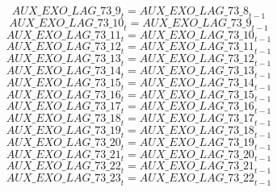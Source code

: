 \begin{dmath}
{AUX\_EXO\_LAG\_73\_9}_{t}={AUX\_EXO\_LAG\_73\_8}_{t-1}
\end{dmath}
\begin{dmath}
{AUX\_EXO\_LAG\_73\_10}_{t}={AUX\_EXO\_LAG\_73\_9}_{t-1}
\end{dmath}
\begin{dmath}
{AUX\_EXO\_LAG\_73\_11}_{t}={AUX\_EXO\_LAG\_73\_10}_{t-1}
\end{dmath}
\begin{dmath}
{AUX\_EXO\_LAG\_73\_12}_{t}={AUX\_EXO\_LAG\_73\_11}_{t-1}
\end{dmath}
\begin{dmath}
{AUX\_EXO\_LAG\_73\_13}_{t}={AUX\_EXO\_LAG\_73\_12}_{t-1}
\end{dmath}
\begin{dmath}
{AUX\_EXO\_LAG\_73\_14}_{t}={AUX\_EXO\_LAG\_73\_13}_{t-1}
\end{dmath}
\begin{dmath}
{AUX\_EXO\_LAG\_73\_15}_{t}={AUX\_EXO\_LAG\_73\_14}_{t-1}
\end{dmath}
\begin{dmath}
{AUX\_EXO\_LAG\_73\_16}_{t}={AUX\_EXO\_LAG\_73\_15}_{t-1}
\end{dmath}
\begin{dmath}
{AUX\_EXO\_LAG\_73\_17}_{t}={AUX\_EXO\_LAG\_73\_16}_{t-1}
\end{dmath}
\begin{dmath}
{AUX\_EXO\_LAG\_73\_18}_{t}={AUX\_EXO\_LAG\_73\_17}_{t-1}
\end{dmath}
\begin{dmath}
{AUX\_EXO\_LAG\_73\_19}_{t}={AUX\_EXO\_LAG\_73\_18}_{t-1}
\end{dmath}
\begin{dmath}
{AUX\_EXO\_LAG\_73\_20}_{t}={AUX\_EXO\_LAG\_73\_19}_{t-1}
\end{dmath}
\begin{dmath}
{AUX\_EXO\_LAG\_73\_21}_{t}={AUX\_EXO\_LAG\_73\_20}_{t-1}
\end{dmath}
\begin{dmath}
{AUX\_EXO\_LAG\_73\_22}_{t}={AUX\_EXO\_LAG\_73\_21}_{t-1}
\end{dmath}
\begin{dmath}
{AUX\_EXO\_LAG\_73\_23}_{t}={AUX\_EXO\_LAG\_73\_22}_{t-1}
\end{dmath}
